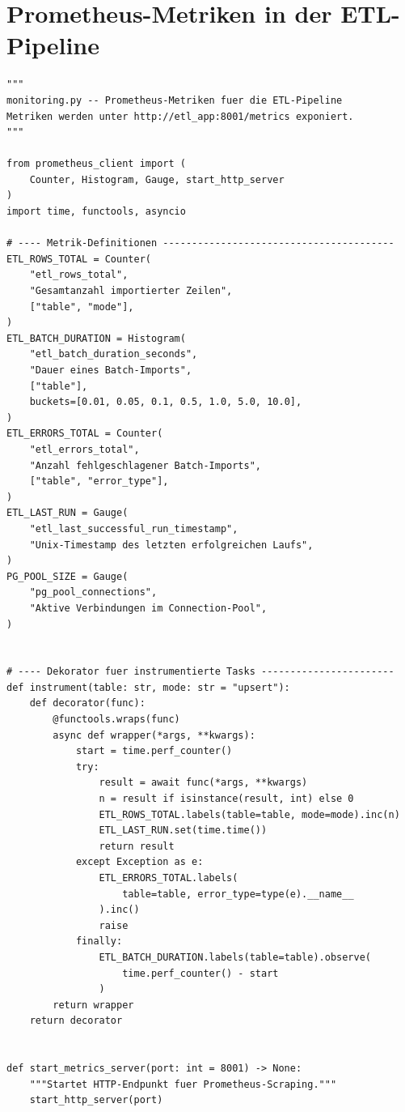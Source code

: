 ﻿\documentclass[12pt,a4paper]{report}
\theoremstyle{definition}
\theoremstyle{remark}
\begin{document}
\section{Prometheus-Metriken in der ETL-Pipeline}

\begin{lstlisting}[style=python, caption={monitoring.py: ETL-Metriken via Prometheus-Client}, label=lst:monitoring]
"""
monitoring.py -- Prometheus-Metriken fuer die ETL-Pipeline
Metriken werden unter http://etl_app:8001/metrics exponiert.
"""

from prometheus_client import (
    Counter, Histogram, Gauge, start_http_server
)
import time, functools, asyncio

# ---- Metrik-Definitionen ----------------------------------------
ETL_ROWS_TOTAL = Counter(
    "etl_rows_total",
    "Gesamtanzahl importierter Zeilen",
    ["table", "mode"],
)
ETL_BATCH_DURATION = Histogram(
    "etl_batch_duration_seconds",
    "Dauer eines Batch-Imports",
    ["table"],
    buckets=[0.01, 0.05, 0.1, 0.5, 1.0, 5.0, 10.0],
)
ETL_ERRORS_TOTAL = Counter(
    "etl_errors_total",
    "Anzahl fehlgeschlagener Batch-Imports",
    ["table", "error_type"],
)
ETL_LAST_RUN = Gauge(
    "etl_last_successful_run_timestamp",
    "Unix-Timestamp des letzten erfolgreichen Laufs",
)
PG_POOL_SIZE = Gauge(
    "pg_pool_connections",
    "Aktive Verbindungen im Connection-Pool",
)


# ---- Dekorator fuer instrumentierte Tasks -----------------------
def instrument(table: str, mode: str = "upsert"):
    def decorator(func):
        @functools.wraps(func)
        async def wrapper(*args, **kwargs):
            start = time.perf_counter()
            try:
                result = await func(*args, **kwargs)
                n = result if isinstance(result, int) else 0
                ETL_ROWS_TOTAL.labels(table=table, mode=mode).inc(n)
                ETL_LAST_RUN.set(time.time())
                return result
            except Exception as e:
                ETL_ERRORS_TOTAL.labels(
                    table=table, error_type=type(e).__name__
                ).inc()
                raise
            finally:
                ETL_BATCH_DURATION.labels(table=table).observe(
                    time.perf_counter() - start
                )
        return wrapper
    return decorator


def start_metrics_server(port: int = 8001) -> None:
    """Startet HTTP-Endpunkt fuer Prometheus-Scraping."""
    start_http_server(port)
\end{lstlisting}
\end{document}
